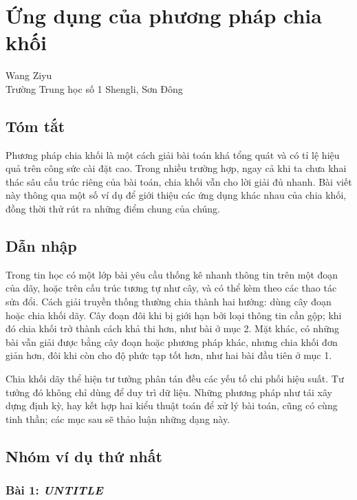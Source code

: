 \documentclass[11pt]{article}
\begin{document}
\section{Ứng dụng của phương pháp chia khối}

\begin{center}
Wang Ziyu\\
Trường Trung học số 1 Shengli, Sơn Đông
\end{center}

\subsection*{Tóm tắt}

Phương pháp chia khối là một cách giải bài toán khá tổng quát và có tỉ lệ
hiệu quả trên công sức cài đặt cao. Trong nhiều trường hợp, ngay cả khi ta
chưa khai thác sâu cấu trúc riêng của bài toán, chia khối vẫn cho lời giải đủ
nhanh. Bài viết này thông qua một số ví dụ để giới thiệu các ứng dụng khác
nhau của chia khối, đồng thời thử rút ra những điểm chung của chúng.

\subsection{Dẫn nhập}

Trong tin học có một lớp bài yêu cầu thống kê nhanh thông tin trên một đoạn
của dãy, hoặc trên cấu trúc tương tự như cây, và có thể kèm theo các thao tác
sửa đổi. Cách giải truyền thống thường chia thành hai hướng: dùng cây đoạn
hoặc chia khối dãy. Cây đoạn đôi khi bị giới hạn bởi loại thông tin cần gộp;
khi đó chia khối trở thành cách khả thi hơn, như bài ở mục 2. Mặt khác, có
những bài vẫn giải được bằng cây đoạn hoặc phương pháp khác, nhưng chia khối
đơn giản hơn, đôi khi còn cho độ phức tạp tốt hơn, như hai bài đầu tiên ở mục
1.

Chia khối dãy thể hiện tư tưởng phân tán đều các yếu tố chi phối hiệu suất.
Tư tưởng đó không chỉ dùng để duy trì dữ liệu. Những phương pháp như tái xây
dựng định kỳ, hay kết hợp hai kiểu thuật toán để xử lý bài toán, cũng có cùng
tinh thần; các mục sau sẽ thảo luận những dạng này.

\subsection{Nhóm ví dụ thứ nhất}

\subsubsection{Bài 1: \emph{UNTITLE}}
\end{document}
